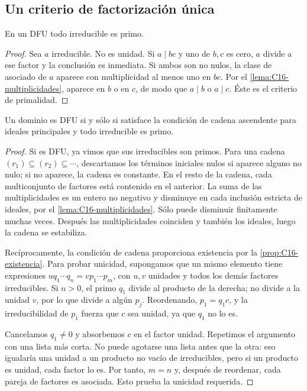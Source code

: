 \subsection{Un criterio de factorización única}\label{tema:16-3-1}
\begin{lema}\label{lema:C16-irreducible-primo}
En un DFU todo irreducible es primo.
\end{lema}
\begin{proof}
Sea $a$ irreducible. No es unidad. Si $a\mid bc$ y uno de $b,c$ es cero, $a$ divide a ese factor y la conclusión es inmediata. Si ambos son no nulos, la clase de asociado de $a$ aparece con multiplicidad al menos uno en $bc$. Por el \cref{lema:C16-multiplicidades}, aparece en $b$ o en $c$, de modo que $a\mid b$ o $a\mid c$. Éste es el criterio de primalidad.
\end{proof}

\begin{teo}\label{teo:C16-criterio}
Un dominio es DFU si y sólo si satisface la condición de cadena ascendente para ideales principales y todo irreducible es primo.
\end{teo}
\begin{proof}
Si es DFU, ya vimos que sus irreducibles son primos. Para una cadena $(r_1)\subseteq(r_2)\subseteq\cdots$, descartamos los términos iniciales nulos si aparece alguno no nulo; si no aparece, la cadena es constante. En el resto de la cadena, cada multiconjunto de factores está contenido en el anterior. La suma de las multiplicidades es un entero no negativo y disminuye en cada inclusión estricta de ideales, por el \cref{lema:C16-multiplicidades}. Sólo puede disminuir finitamente muchas veces. Después las multiplicidades coinciden y también los ideales, luego la cadena se estabiliza.

Recíprocamente, la condición de cadena proporciona existencia por la \cref{prop:C16-existencia}. Para probar unicidad, supongamos que un mismo elemento tiene expresiones $u q_1\cdots q_n=v p_1\cdots p_m$, con $u,v$ unidades y todos los demás factores irreducibles. Si $n>0$, el primo $q_1$ divide al producto de la derecha; no divide a la unidad $v$, por lo que divide a algún $p_j$. Reordenando, $p_1=q_1c$, y la irreducibilidad de $p_1$ fuerza que $c$ sea unidad, ya que $q_1$ no lo es.

Cancelamos $q_1\ne0$ y absorbemos $c$ en el factor unidad. Repetimos el argumento con una lista más corta. No puede agotarse una lista antes que la otra: eso igualaría una unidad a un producto no vacío de irreducibles, pero si un producto es unidad, cada factor lo es. Por tanto, $m=n$ y, después de reordenar, cada pareja de factores es asociada. Esto prueba la unicidad requerida.
\end{proof}
